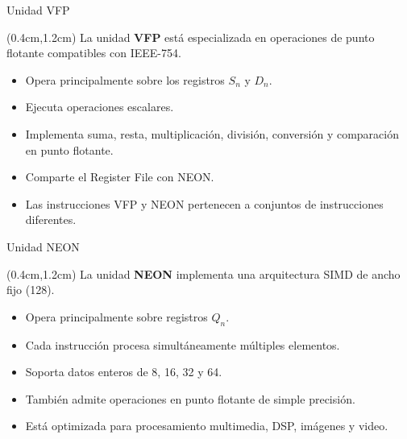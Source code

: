 \begin{frame}{Unidad VFP}
 \begin{textblock*}{\textwidth}(0.4cm,1.2cm)
  \justifying
  La unidad \textbf{VFP} está especializada en operaciones de punto flotante compatibles con IEEE-754.
  \vspace{0.3cm}
  \begin{itemize}[<+(1)->]
   \item Opera principalmente sobre los registros $S_{n}$ y $D_{n}$.
   \item Ejecuta operaciones escalares.
   \item Implementa suma, resta, multiplicación, división, conversión y comparación en punto flotante.
   \item Comparte el Register File con NEON.
   \item Las instrucciones VFP y NEON pertenecen a conjuntos de instrucciones diferentes.
  \end{itemize}
  \vspace{0.4cm}
 \end{textblock*}
\end{frame}

\begin{frame}{Unidad NEON}
 \begin{textblock*}{\textwidth}(0.4cm,1.2cm)
  \justifying La unidad \textbf{NEON} implementa una arquitectura SIMD de ancho fijo  (\SI{128}{\bit}).
  \vspace{0.3cm}
  \begin{itemize}[<+(1)->]
   \item Opera principalmente sobre registros $Q_{n}$.
   \item Cada instrucción procesa simultáneamente múltiples elementos.
   \item Soporta datos enteros de 8, 16, 32 y \SI{64}{\bit}.
   \item También admite operaciones en punto flotante de simple precisión.
   \item Está optimizada para procesamiento multimedia, DSP, imágenes y video.
  \end{itemize}
  \vspace{0.4cm}
 \end{textblock*}
\end{frame}

